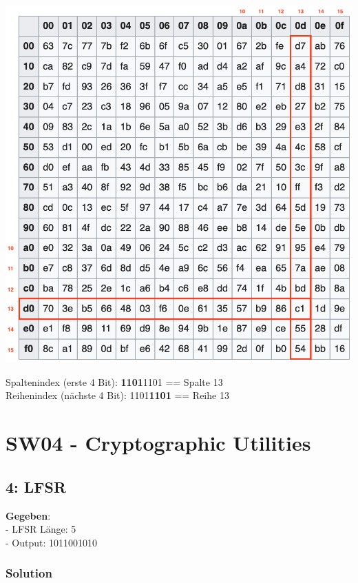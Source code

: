 \documentclass[11pt]{article}
\begin{document}
\includegraphics[scale=0.4]{img/aes_sbox.png}

Spaltenindex (erste 4 Bit): \textbf{1101}1101 == Spalte 13\\
Reihenindex (nächste 4 Bit): 1101\textbf{1101} == Reihe 13

    
\newpage

    \hypertarget{sw04---cryptographic-utilities}{%
\section{SW04 - Cryptographic
Utilities}\label{sw04---cryptographic-utilities}}

    \hypertarget{lfsr}{%
\subsection{4: LFSR}\label{lfsr}}

\textbf{Gegeben}: \\
- LFSR Länge: 5 \\
- Output: 1011001010

\hypertarget{solution}{%
\subsubsection{Solution}\label{solution}}
\end{document}
